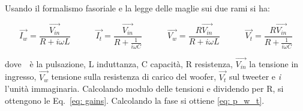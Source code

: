 \documentclass[../Relazione_circuiti]{subfiles}
\begin{document}
Usando il formalismo fasoriale e la legge delle maglie sui due rami si ha:

\begin{equation*}
  \overrightarrow{I_{w}} = \frac{\overrightarrow{V_{in}}}{R+i \omega L} \qquad \quad %
  \overrightarrow{I_{t}} = \frac{\overrightarrow{V_{in}}}{R+\frac{1}{i \omega C}} \qquad \quad %
    \overrightarrow{V_{w}} = \frac{R \overrightarrow{V_{in}}}{R+i \omega L} \qquad \quad %
  \overrightarrow{V_{t}} = \frac{R \overrightarrow{V_{in}}}{R+\frac{1}{i \omega C}}  
\end{equation*}

dove \textomega \,\ è la pulsazione, L induttanza, C capacità, R resistenza, $\overrightarrow{V_{in}}$ la tensione in ingresso, $\overrightarrow{V_{w}}$ tensione sulla resistenza di carico del woofer, $\overrightarrow{V_{t}}$ sul tweeter e \textit{i} l'unità immaginaria.
Calcolando modulo delle tensioni e dividendo per R, si ottengono le Eq.\, \eqref{eq: gains}. Calcolando la fase si ottiene \eqref{eq: p_w_t}.
\end{document}
